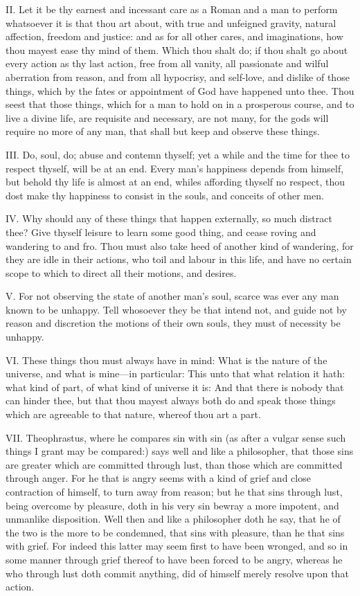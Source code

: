 II. Let it be thy earnest and incessant care as a Roman and a man to
perform whatsoever it is that thou art about, with true and unfeigned
gravity, natural affection, freedom and justice: and as for all other
cares, and imaginations, how thou mayest ease thy mind of them. Which thou
shalt do; if thou shalt go about every action as thy last action, free
from all vanity, all passionate and wilful aberration from reason, and
from all hypocrisy, and self-love, and dislike of those things, which by
the fates or appointment of God have happened unto thee. Thou seest that
those things, which for a man to hold on in a prosperous course, and to
live a divine life, are requisite and necessary, are not many, for the
gods will require no more of any man, that shall but keep and observe
these things.

III. Do, soul, do; abuse and contemn thyself; yet a while and the time
for thee to respect thyself, will be at an end. Every man's happiness
depends from himself, but behold thy life is almost at an end, whiles
affording thyself no respect, thou dost make thy happiness to consist in
the souls, and conceits of other men.

IV. Why should any of these things that happen externally, so much
distract thee? Give thyself leisure to learn some good thing, and cease
roving and wandering to and fro. Thou must also take heed of another kind
of wandering, for they are idle in their actions, who toil and labour in
this life, and have no certain scope to which to direct all their motions,
and desires.

V. For not observing the state of another man's soul, scarce was ever
any man known to be unhappy. Tell whosoever they be that intend not, and
guide not by reason and discretion the motions of their own souls, they
must of necessity be unhappy.

VI. These things thou must always have in mind: What is the nature
of the universe, and what is mine—in particular: This unto that what
relation it hath: what kind of part, of what kind of universe it is: And
that there is nobody that can hinder thee, but that thou mayest always
both do and speak those things which are agreeable to that nature, whereof
thou art a part.

VII. Theophrastus, where he compares sin with sin (as after a vulgar
sense such things I grant may be compared:) says well and like a
philosopher, that those sins are greater which are committed through lust,
than those which are committed through anger. For he that is angry seems
with a kind of grief and close contraction of himself, to turn away from
reason; but he that sins through lust, being overcome by pleasure, doth in
his very sin bewray a more impotent, and unmanlike disposition. Well then
and like a philosopher doth he say, that he of the two is the more to be
condemned, that sins with pleasure, than he that sins with grief. For
indeed this latter may seem first to have been wronged, and so in some
manner through grief thereof to have been forced to be angry, whereas he
who through lust doth commit anything, did of himself merely resolve upon
that action.

